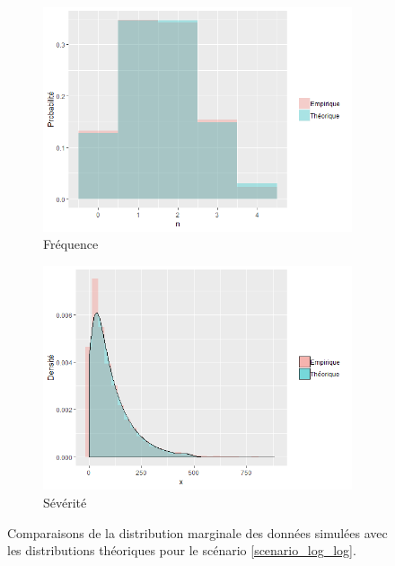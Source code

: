 \documentclass{article}
\begin{document}
		\begin{figure}[H]
			\begin{subfigure}[l]{0.5\textwidth}
				\includegraphics[width=\textwidth]{Graph/log_log_N.png}
				\caption{Fréquence}
			\end{subfigure}
			\begin{subfigure}[r]{0.5\textwidth}
				\includegraphics[width=\textwidth]{Graph/log_log_X.png}
				\caption{Sévérité}
			\end{subfigure}
			\caption{Comparaisons de la distribution marginale des données simulées avec les distributions théoriques pour le scénario \ref{scenario_log_log}.}
			\label{graph_densite_log_log}
		\end{figure}
	
\end{document}
